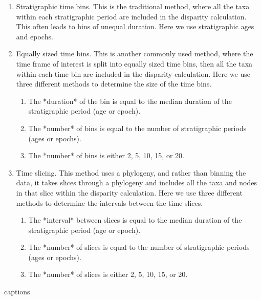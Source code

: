 \documentclass[12pt,a4paper]{article}
\begin{document}
\begin{enumerate}
  \item Stratigraphic time bins. This is the traditional method, where all the taxa within each stratigraphic period are included in the disparity calculation. This often leads to bins of unequal duration. Here we use stratigraphic ages and epochs.
  \item Equally sized time bins. This is another commonly used method, where the time frame of interest is split into equally sized time bins, then all the taxa within each time bin are included in the disparity calculation. Here we use three different methods to determine the size of the time bins. 
    \begin{enumerate}
      \item The *duration* of the bin is equal to the median duration of the stratigraphic period (age or epoch).
      \item The *number* of bins is equal to the number of stratigraphic periods (ages or epochs).
      \item The *number* of bins is either 2, 5, 10, 15, or 20.
    \end{enumerate}
  \item Time slicing. This method uses a phylogeny, and rather than binning the data, it takes slices through a phylogeny and includes all the taxa and nodes in that slice within the disparity calculation. Here we use three different methods to determine the intervals between the time slices.
    \begin{enumerate}
      \item The *interval* between slices is equal to the median duration of the stratigraphic period (age or epoch).
      \item The *number* of slices is equal to the number of stratigraphic periods (ages or epochs).
      \item The *number* of slices is either 2, 5, 10, 15, or 20.
    \end{enumerate}  
\end{enumerate}


  \begin{table}[!htbp]      
    \caption[Subsamples.]
    {captions}
     
    \label{tab:subsamples}  
  \end{table}

\end{document}
